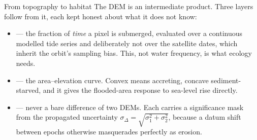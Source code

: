 \begin{pblock}{From topography to habitat}
The DEM is an intermediate product. Three layers follow from it, each kept
honest about what it does not know:

\begin{itemize}
  \item {} — the fraction of \emph{time} a pixel is
        submerged, evaluated over a continuous modelled tide series and
        deliberately not over the satellite dates, which inherit the orbit's
        sampling bias. This, not water frequency, is what ecology needs.
  \item {} — the area--elevation curve. Convex means accreting,
        concave sediment-starved, and it gives the flooded-area response to
        sea-level rise directly.
  \item {} — never a bare difference of two DEMs.
        Each carries a significance mask from the propagated uncertainty
        $\sigma_\Delta=\sqrt{\sigma_1^2+\sigma_2^2}$, because a datum shift
        between epochs otherwise masquerades perfectly as erosion.
\end{itemize}
\end{pblock}

